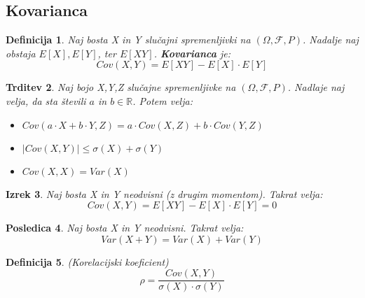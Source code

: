 \documentclass[11pt]{article}
\newtheorem{Izrek}{{\sc Izrek}}[section]
\newtheorem{Trditev}[Izrek]{{\sc Trditev}}
\newtheorem{Posledica}[Izrek]{{\sc Posledica}}
\newtheorem{Definicija}[Izrek]{{\sc Definicija}}
\begin{document}
\subsection{Kovarianca}
\begin{Definicija}
Naj bosta X in Y slučajni spremenljivki na $(\Omega,\mathcal{F},P)$. Nadalje naj obstaja $E[X], E[Y]$, ter $E[XY]$. \textbf{Kovarianca} je:
$$Cov(X,Y) = E[XY] - E[X] \cdot E[Y]$$
\end{Definicija}
\begin{Trditev} 
Naj bojo X,Y,Z slučajne spremenljivke na  $(\Omega,\mathcal{F},P)$. Nadlaje naj velja, da sta števili $a$ in $b\in \mathbb{R}$. Potem velja:
\begin{itemize}
\item
$Cov(a\cdot X + b\cdot Y, Z) = a \cdot Cov(X,Z) + b\cdot Cov(Y,Z)$
\item
$|Cov(X,Y)| \le \sigma (X) + \sigma (Y)$
\item
$Cov(X,X) = Var(X)$
\end{itemize}
\end{Trditev}
\begin{Izrek}
Naj bosta X in Y neodvisni (z drugim momentom). Takrat velja:
$$Cov(X,Y) = E[XY] - E[X] \cdot E[Y] = 0$$
\end{Izrek}
\begin{Posledica}
Naj bosta X in Y neodvisni. Takrat velja:
$$Var(X + Y) = Var(X) + Var(Y)$$
\end{Posledica}
\begin{Definicija}
(Korelacijski koeficient)
$$\rho  = \frac{Cov(X,Y)}{\sigma (X) \cdot \sigma (Y)}$$
\end{Definicija}
\end{document}

